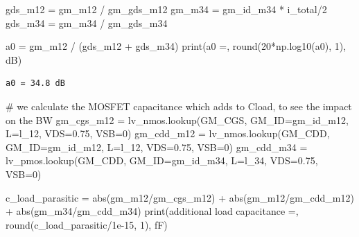 \documentclass[
  a4paper,
  DIV=11,
  numbers=noendperiod]{scrartcl}
\newenvironment{Shaded}{\begin{snugshade}}{\end{snugshade}}
\newcommand{\BuiltInTok}[1]{\textcolor[rgb]{0.00,0.23,0.31}{#1}}
\newcommand{\CommentTok}[1]{\textcolor[rgb]{0.37,0.37,0.37}{#1}}
\newcommand{\DecValTok}[1]{\textcolor[rgb]{0.68,0.00,0.00}{#1}}
\newcommand{\FloatTok}[1]{\textcolor[rgb]{0.68,0.00,0.00}{#1}}
\newcommand{\NormalTok}[1]{\textcolor[rgb]{0.00,0.23,0.31}{#1}}
\newcommand{\OperatorTok}[1]{\textcolor[rgb]{0.37,0.37,0.37}{#1}}
\newcommand{\StringTok}[1]{\textcolor[rgb]{0.13,0.47,0.30}{#1}}
\begin{document}
\begin{tcolorbox}
\begin{Shaded}
\begin{Highlighting}[]
\NormalTok{gds\_m12 }\OperatorTok{=}\NormalTok{ gm\_m12 }\OperatorTok{/}\NormalTok{ gm\_gds\_m12}
\NormalTok{gm\_m34 }\OperatorTok{=}\NormalTok{ gm\_id\_m34 }\OperatorTok{*}\NormalTok{ i\_total}\OperatorTok{/}\DecValTok{2}
\NormalTok{gds\_m34 }\OperatorTok{=}\NormalTok{ gm\_m34 }\OperatorTok{/}\NormalTok{ gm\_gds\_m34}

\NormalTok{a0 }\OperatorTok{=}\NormalTok{ gm\_m12 }\OperatorTok{/}\NormalTok{ (gds\_m12 }\OperatorTok{+}\NormalTok{ gds\_m34)}
\BuiltInTok{print}\NormalTok{(}\StringTok{\textquotesingle{}a0 =\textquotesingle{}}\NormalTok{, }\BuiltInTok{round}\NormalTok{(}\DecValTok{20}\OperatorTok{*}\NormalTok{np.log10(a0), }\DecValTok{1}\NormalTok{), }\StringTok{\textquotesingle{}dB\textquotesingle{}}\NormalTok{)}
\end{Highlighting}
\end{Shaded}

\begin{verbatim}
a0 = 34.8 dB
\end{verbatim}

\begin{Shaded}
\begin{Highlighting}[]
\CommentTok{\# we calculate the MOSFET capacitance which adds to Cload, to see the impact on the BW}
\NormalTok{gm\_cgs\_m12 }\OperatorTok{=}\NormalTok{ lv\_nmos.lookup(}\StringTok{\textquotesingle{}GM\_CGS\textquotesingle{}}\NormalTok{, GM\_ID}\OperatorTok{=}\NormalTok{gm\_id\_m12, L}\OperatorTok{=}\NormalTok{l\_12, VDS}\OperatorTok{=}\FloatTok{0.75}\NormalTok{, VSB}\OperatorTok{=}\DecValTok{0}\NormalTok{)}
\NormalTok{gm\_cdd\_m12 }\OperatorTok{=}\NormalTok{ lv\_nmos.lookup(}\StringTok{\textquotesingle{}GM\_CDD\textquotesingle{}}\NormalTok{, GM\_ID}\OperatorTok{=}\NormalTok{gm\_id\_m12, L}\OperatorTok{=}\NormalTok{l\_12, VDS}\OperatorTok{=}\FloatTok{0.75}\NormalTok{, VSB}\OperatorTok{=}\DecValTok{0}\NormalTok{)}
\NormalTok{gm\_cdd\_m34 }\OperatorTok{=}\NormalTok{ lv\_pmos.lookup(}\StringTok{\textquotesingle{}GM\_CDD\textquotesingle{}}\NormalTok{, GM\_ID}\OperatorTok{=}\NormalTok{gm\_id\_m34, L}\OperatorTok{=}\NormalTok{l\_34, VDS}\OperatorTok{=}\FloatTok{0.75}\NormalTok{, VSB}\OperatorTok{=}\DecValTok{0}\NormalTok{)}

\NormalTok{c\_load\_parasitic }\OperatorTok{=} \BuiltInTok{abs}\NormalTok{(gm\_m12}\OperatorTok{/}\NormalTok{gm\_cgs\_m12) }\OperatorTok{+} \BuiltInTok{abs}\NormalTok{(gm\_m12}\OperatorTok{/}\NormalTok{gm\_cdd\_m12) }\OperatorTok{+} \BuiltInTok{abs}\NormalTok{(gm\_m34}\OperatorTok{/}\NormalTok{gm\_cdd\_m34)}
\BuiltInTok{print}\NormalTok{(}\StringTok{\textquotesingle{}additional load capacitance =\textquotesingle{}}\NormalTok{, }\BuiltInTok{round}\NormalTok{(c\_load\_parasitic}\OperatorTok{/}\FloatTok{1e{-}15}\NormalTok{, }\DecValTok{1}\NormalTok{), }\StringTok{\textquotesingle{}fF\textquotesingle{}}\NormalTok{)}


\end{Highlighting}
\end{Shaded}
\end{tcolorbox}
\end{document}
